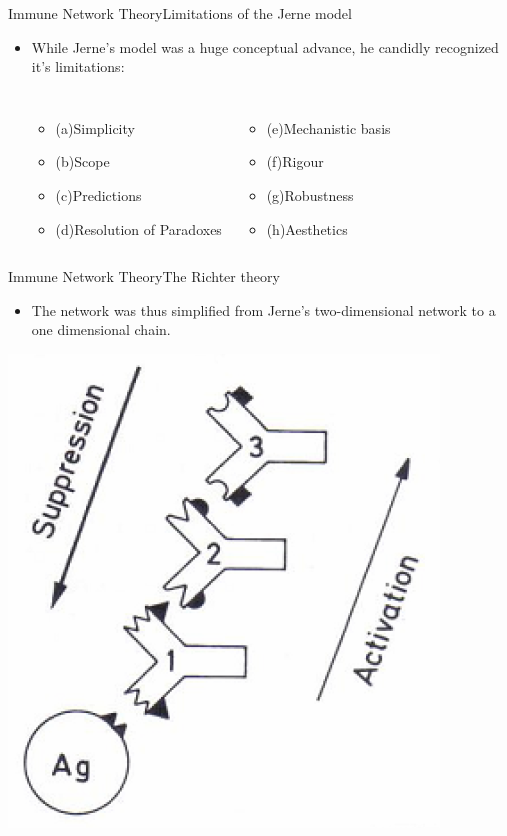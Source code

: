 \begin{frame}{Immune Network Theory}{Limitations of the Jerne model}
  \begin{itemize}
  \item \large
   While Jerne's model was a huge conceptual advance, he candidly recognized it's
   limitations:
   \begin{columns}[c] 
    \begin{itemize}
    \item \large{(a)Simplicity}
    \item \large{(b)Scope}
    \item \large{(c)Predictions}
    \item \large{(d)Resolution of Paradoxes}
    \end{itemize}
    \begin{itemize}
    \item \large{(e)Mechanistic basis}
    \item \large{(f)Rigour}
    \item \large{(g)Robustness}
    \item \large{(h)Aesthetics}
    \end{itemize}
    \end{columns}
  \end{itemize}
\end{frame}

\begin{frame}{Immune Network Theory}{The Richter theory}
  \begin{itemize}
  \item \large
     The network was thus simplified from Jerne's two-dimensional network to a one dimensional chain.
  \end{itemize}
  \par
  \centering
    \includegraphics[scale=0.5] {img/network_model_richter.png}
  \par
\end{frame}

